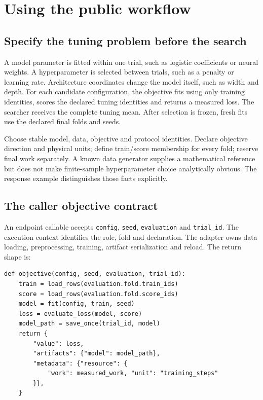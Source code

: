 \chapter{Using the public workflow}
\label{sec:current-guide}

\section{Specify the tuning problem before the search}

A model parameter is fitted within one trial, such as logistic coefficients
or neural weights. A hyperparameter is selected between trials, such as a
penalty or learning rate. Architecture coordinates change the model itself,
such as width and depth. For each candidate configuration, the objective fits
using only training identities, scores the declared tuning identities and
returns a measured loss. The searcher receives the complete tuning mean.
After selection is frozen, fresh fits use the declared final folds and seeds.

Choose stable model, data, objective and protocol identities. Declare objective
direction and physical units; define train/score membership for every fold;
reserve final work separately. A known data generator supplies a mathematical
reference but does not make finite-sample hyperparameter choice analytically
obvious. The response example distinguishes those facts explicitly.

\section{The caller objective contract}

An endpoint callable accepts \texttt{config}, \texttt{seed},
\texttt{evaluation} and \texttt{trial\_id}. The execution context identifies
the role, fold and declaration. The adapter owns data loading, preprocessing,
training, artifact serialization and reload. The return shape is:

\begin{verbatim}
def objective(config, seed, evaluation, trial_id):
    train = load_rows(evaluation.fold.train_ids)
    score = load_rows(evaluation.fold.score_ids)
    model = fit(config, train, seed)
    loss = evaluate_loss(model, score)
    model_path = save_once(trial_id, model)
    return {
        "value": loss,
        "artifacts": {"model": model_path},
        "metadata": {"resource": {
            "work": measured_work, "unit": "training_steps"
        }},
    }
\end{verbatim}


